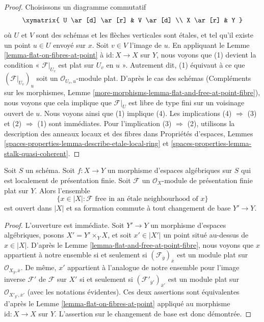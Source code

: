 \begin{proof}
Choisissons un diagramme commutatif
$$
\xymatrix{
U \ar[d] \ar[r] & V \ar[d] \\
X \ar[r] & Y
}
$$
où $U$ et $V$ sont des schémas et les flèches verticales sont étales,
et tel qu'il existe un point $u \in U$ envoyé sur $x$. Soit $v \in V$
l'image de $u$. En appliquant le Lemme \ref{lemma-flat-on-fibres-at-point}
à $\text{id} : X \to X$ sur $Y$, nous voyons que (1) devient
la condition « $\mathcal{F}|_{U_v}$ est plat sur $U_v$ en $u$ ».
Autrement dit, (1) équivaut à ce que $(\mathcal{F}|_{U_v})_u$
soit un $\mathcal{O}_{U_v, u}$-module plat.
D'après le cas des schémas (Compléments sur les morphismes, Lemme
\ref{more-morphisms-lemma-flat-and-free-at-point-fibre}),
nous voyons que cela implique que
$\mathcal{F}|_U$ est libre de type fini sur un voisinage ouvert
de $u$. Nous voyons ainsi que (1) implique (4).
Les implications (4) $\Rightarrow$ (3) et
(2) $\Rightarrow$ (1) sont immédiates.
Pour l'implication (3) $\Rightarrow$ (2), utilisons
la description des anneaux locaux et des fibres dans
Propriétés d'espaces, Lemmes
\ref{spaces-properties-lemma-describe-etale-local-ring} et
\ref{spaces-properties-lemma-stalk-quasi-coherent}.
\end{proof}

\begin{lemma}
\label{lemma-finite-free-open}
Soit $S$ un schéma. Soit $f : X \to Y$ un morphisme d'espaces algébriques
sur $S$ qui est localement de présentation finie.
Soit $\mathcal{F}$ un $\mathcal{O}_X$-module de présentation finie
plat sur $Y$. Alors l'ensemble
$$
\{x \in |X| : \mathcal{F}\text{ free in an \'etale neighbourhood of }x\}
$$
est ouvert dans $|X|$ et sa formation commute à tout changement de base
$Y' \to Y$.
\end{lemma}

\begin{proof}
L'ouverture est immédiate. Soit $Y' \to Y$ un morphisme d'espaces algébriques,
posons $X' = Y' \times_Y X$,
et soit $x' \in |X'|$ un point situé au-dessus de $x \in |X|$.
D'après le Lemme \ref{lemma-flat-and-free-at-point-fibre},
nous voyons que $x$ appartient à notre ensemble si et seulement si
$(\mathcal{F}_{\overline{y}})_{\overline{x}}$ est un module plat sur
$\mathcal{O}_{X_{\overline{y}}, \overline{x}}$.
De même, $x'$ appartient à l'analogue de notre ensemble pour l'image inverse
$\mathcal{F}'$ de $\mathcal{F}$ sur $X'$ si et seulement si
$(\mathcal{F}'_{\overline{y}'})_{\overline{x}'}$ est un module plat sur
$\mathcal{O}_{X'_{\overline{y}'}, \overline{x}'}$
(avec les notations évidentes). Ces deux assertions sont équivalentes
d'après le Lemme \ref{lemma-flat-on-fibres-at-point} appliqué au
morphisme $\text{id} : X \to X$ sur $Y$.
L'assertion sur le changement de base est donc démontrée.
\end{proof}







